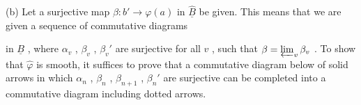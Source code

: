 (b)  Let a surjective map $\beta : b' \to \varphi(a)$ in $\widehat{\underline{B}}$ be given. This means that we are given a sequence of commutative diagrams
in $\underline{B}$ , where $\alpha_{v}$ , $\beta_{v}$ , $\beta_{v}'$ are surjective for all $v$ , such that $\beta = \varprojlim_{v} \beta_{v}$ . To show that $\widehat{\varphi}$ is smooth, it suffices to prove that a commutative diagram below of solid arrows in which $\alpha_{n}$ , $\beta_{n}$ , $\beta_{n+1}$ , $\beta_{n}'$ are surjective can be completed into a commutative diagram including dotted arrows.

